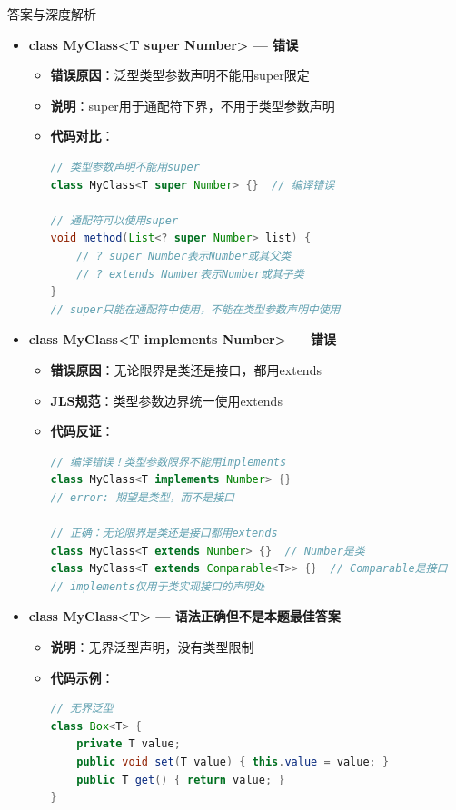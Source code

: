 \documentclass[12pt, a4paper]{ctexart}
\begin{document}
\begin{enumerate}[label=\textbf{\arabic*.}]
\begin{bluebox}{答案与深度解析}
\begin{itemize}[leftmargin=*, nosep, label={}]
			      \item[B] \textbf{class MyClass<T super Number> — 错误}
			            \begin{itemize}[label={}, leftmargin=*, nosep]
				            \item \textbf{错误原因}：泛型类型参数声明不能用super限定
				            \item \textbf{说明}：super用于通配符下界，不用于类型参数声明
				            \item \textbf{代码对比}：
				                  \begin{lstlisting}[language=Java]
// 类型参数声明不能用super
class MyClass<T super Number> {}  // 编译错误

// 通配符可以使用super
void method(List<? super Number> list) {
    // ? super Number表示Number或其父类
    // ? extends Number表示Number或其子类
}
// super只能在通配符中使用，不能在类型参数声明中使用
				      \end{lstlisting}
			            \end{itemize}

			      \item[C] \textbf{class MyClass<T implements Number> — 错误}
			            \begin{itemize}[label={}, leftmargin=*, nosep]
				            \item \textbf{错误原因}：无论限界是类还是接口，都用extends
				            \item \textbf{JLS规范}：类型参数边界统一使用extends
				            \item \textbf{代码反证}：
				                  \begin{lstlisting}[language=Java]
// 编译错误！类型参数限界不能用implements
class MyClass<T implements Number> {}
// error: 期望是类型，而不是接口

// 正确：无论限界是类还是接口都用extends
class MyClass<T extends Number> {}  // Number是类
class MyClass<T extends Comparable<T>> {}  // Comparable是接口
// implements仅用于类实现接口的声明处
				      \end{lstlisting}
			            \end{itemize}

			      \item[D] \textbf{class MyClass<T> — 语法正确但不是本题最佳答案}
			            \begin{itemize}[label={}, leftmargin=*, nosep]
				            \item \textbf{说明}：无界泛型声明，没有类型限制
				            \item \textbf{代码示例}：
				                  \begin{lstlisting}[language=Java]
// 无界泛型
class Box<T> {
    private T value;
    public void set(T value) { this.value = value; }
    public T get() { return value; }
}


\end{lstlisting}
\end{itemize}
\end{itemize}
\end{bluebox}
\end{enumerate}
\end{document}
